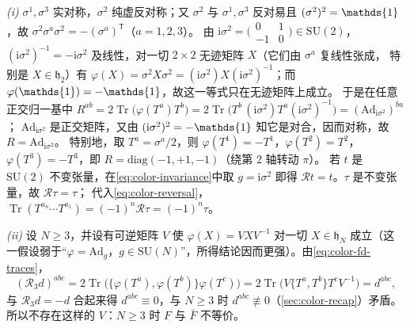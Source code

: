\documentclass[UTF8,a4paper,11pt,fontset=fandol]{ctexart}
\makeatletter
\let\amsmathbb\mathbb
\renewcommand{\mathbb}[1]{\ifx1#1\mathds{1}\else\amsmathbb{#1}\fi}
\theoremstyle{cplain}
\theoremstyle{cdefinition}
\theoremstyle{cremark}
\renewcommand{\proofname}{证明}
\renewenvironment{proof}[1][\proofname]{\par\pushQED{\qed}\normalfont\topsep6\p@\@plus6\p@\relax
  \trivlist\item[\hskip\labelsep\itshape #1\hspace{0.5em}]\ignorespaces}{\popQED\endtrivlist\@endpefalse}
\numberwithin{equation}{section}
\DeclareMathOperator{\Tr}{Tr}
\newcommand{\tp}{\mathsf{T}}                         %
\newcommand{\Rop}{\mathcal{R}}                       %
\newcommand{\ii}{\mathrm{i}}                        %
\makeatother
\begin{document}
\begin{proof}
\emph{(i)} $\sigma^1,\sigma^3$ 实对称，$\sigma^2$ 纯虚反对称；又 $\sigma^2$ 与 $\sigma^1,\sigma^3$ 反对易且 $(\sigma^2)^2=\mathbb 1$，故 $\sigma^2\sigma^a\sigma^2=-(\sigma^a)^{\tp}$（$a=1,2,3$）。
由 $\ii\sigma^2=\bigl(\begin{smallmatrix}0&1\\-1&0\end{smallmatrix}\bigr)\in\mathrm{SU}(2)$，$(\ii\sigma^2)^{-1}=-\ii\sigma^2$ 及线性，对一切 $2\times2$ 无迹矩阵 $X$（它们由 $\sigma^a$ 复线性张成，
特别是 $X\in\mathfrak h_2$）有 $\varphi(X)=\sigma^2X\sigma^2=(\ii\sigma^2)X(\ii\sigma^2)^{-1}$；而 $\varphi(\mathbb 1)=-\mathbb 1$，故这一等式只在无迹矩阵上成立。
于是在任意正交归一基中 $R^{ab}=2\Tr\bigl(\varphi(T^a)T^b\bigr)=2\Tr\bigl(T^b\,(\ii\sigma^2)T^a(\ii\sigma^2)^{-1}\bigr)=(\mathrm{Ad}_{\ii\sigma^2})^{ba}$；
$\mathrm{Ad}_{\ii\sigma^2}$ 是正交矩阵，又由 $(\ii\sigma^2)^2=-\mathbb 1$ 知它是对合，因而对称，故 $R=\mathrm{Ad}_{\ii\sigma^2}$。
特别地，取 $T^a=\sigma^a/2$，则 $\varphi(T^1)=-T^1$，$\varphi(T^2)=T^2$，$\varphi(T^3)=-T^3$，即 $R=\mathrm{diag}(-1,+1,-1)$（绕第 2 轴转动 $\pi$）。
若 $t$ 是 $\mathrm{SU}(2)$ 不变张量，在\cref{eq:color-invariance}中取 $g=\ii\sigma^2$ 即得 $\Rop t=t$。$\tau$ 是不变张量，故 $\Rop\tau=\tau$；
代入\cref{eq:color-reversal}，$\Tr(T^{a_n}\cdots T^{a_1})=(-1)^n\Rop\tau=(-1)^n\tau$。

\emph{(ii)} 设 $N\ge3$，并设有可逆矩阵 $V$ 使 $\varphi(X)=VXV^{-1}$ 对一切 $X\in\mathfrak h_N$ 成立（这一假设弱于“$\varphi=\mathrm{Ad}_g$，$g\in\mathrm{SU}(N)$”，所得结论因而更强）。由\cref{eq:color-fd-traces}，
\[
(\Rop_3d)^{abc}=2\Tr\bigl(\{\varphi(T^a),\varphi(T^b)\}\varphi(T^c)\bigr)=2\Tr\bigl(V\{T^a,T^b\}T^cV^{-1}\bigr)=d^{abc},
\]
与 $\Rop_3d=-d$ 合起来得 $d^{abc}\equiv0$，与 $N\ge3$ 时 $d^{abc}\not\equiv0$（\cref{sec:color-recap}）矛盾。所以不存在这样的 $V$：$N\ge3$ 时 $F$ 与 $\bar F$ 不等价。
\end{proof}
\end{document}
